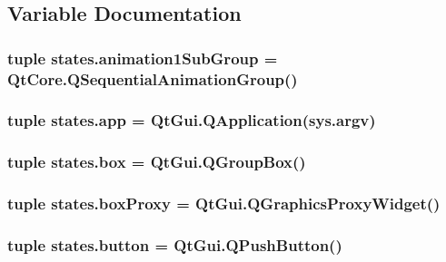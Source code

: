 \subsection{Variable Documentation}
\hypertarget{namespacestates_ace63a368aac03494c93e2f796541bb0a}{}
\subsubsection[{animation1\+Sub\+Group}]{\setlength{\rightskip}{0pt plus 5cm}tuple states.\+animation1\+Sub\+Group = Qt\+Core.\+Q\+Sequential\+Animation\+Group()}\label{namespacestates_ace63a368aac03494c93e2f796541bb0a}
\hypertarget{namespacestates_ad28306c70ff5e9b1060d0f23f79d5e23}{}
\subsubsection[{app}]{\setlength{\rightskip}{0pt plus 5cm}tuple states.\+app = Qt\+Gui.\+Q\+Application(sys.\+argv)}\label{namespacestates_ad28306c70ff5e9b1060d0f23f79d5e23}
\hypertarget{namespacestates_a500d5d2547d02fc40e81e8cb66e04763}{}
\subsubsection[{box}]{\setlength{\rightskip}{0pt plus 5cm}tuple states.\+box = Qt\+Gui.\+Q\+Group\+Box()}\label{namespacestates_a500d5d2547d02fc40e81e8cb66e04763}
\hypertarget{namespacestates_aebb5c2a423cc3bd4da9b5cf57151089b}{}
\subsubsection[{box\+Proxy}]{\setlength{\rightskip}{0pt plus 5cm}tuple states.\+box\+Proxy = Qt\+Gui.\+Q\+Graphics\+Proxy\+Widget()}\label{namespacestates_aebb5c2a423cc3bd4da9b5cf57151089b}
\hypertarget{namespacestates_ab6e634155862a8c4a3ba53686ba9f1de}{}
\subsubsection[{button}]{\setlength{\rightskip}{0pt plus 5cm}tuple states.\+button = Qt\+Gui.\+Q\+Push\+Button()}\label{namespacestates_ab6e634155862a8c4a3ba53686ba9f1de}
\hypertarget{namespacestates_ab4f1d20293f951de72c060e085560681}{}
